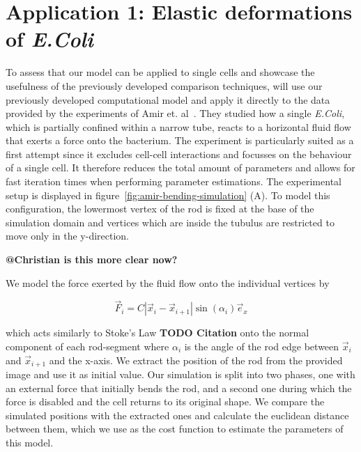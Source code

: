 \documentclass{article}
\begin{document}
\section{Application 1: Elastic deformations of \textit{E.Coli}}

To assess that our model can be applied to single cells and showcase the usefulness of the
previously developed comparison techniques,
will use our previously developed computational model and apply it directly to the data provided
by the experiments of Amir et. al~\cite{Amir2014,Amir2014_2}.
They studied how a single \textit{E.Coli}, which is partially confined within a narrow tube, reacts
to a horizontal fluid flow that exerts a force onto the bacterium.
The experiment is particularly suited as a first attempt since it excludes cell-cell interactions
and focusses on the behaviour of a single cell.
It therefore reduces the total amount of parameters and allows for fast iteration times when
performing parameter estimations.
The experimental setup is displayed in figure~\ref{fig:amir-bending-simulation} (A).
To model this configuration, the lowermost vertex of the rod is fixed at the base of the simulation
domain and vertices which are inside the tubulus are restricted to move only in the y-direction.

\textbf{@Christian is this more clear now?}

We model the force exerted by the fluid flow onto the individual vertices by

\begin{equation}
    \vec{F}_i = C |\vec{x}_i - \vec{x}_{i+1}|\sin(\alpha_i)\vec{e}_x
\end{equation}

which acts similarly to Stoke's Law \textbf{TODO Citation} onto the normal component of each
rod-segment where $\alpha_i$ is the angle of the rod edge between $\vec{x}_i$ and $\vec{x}_{i+1}$
and the x-axis.
We extract the position of the rod from the provided image and use it as initial value.
Our simulation is split into two phases, one with an external force that initially bends the rod,
and a second one during which the force is disabled and the cell returns to its original shape.
We compare the simulated positions with the extracted ones and calculate the euclidean distance
between them, which we use as the cost function to estimate the parameters of this model.
\end{document}

